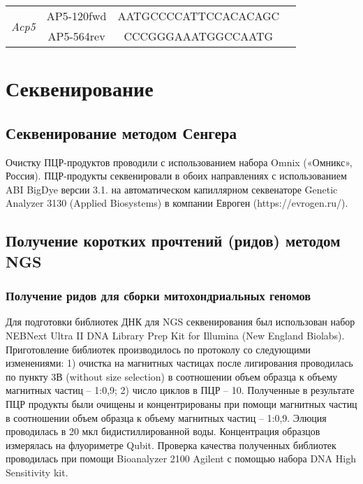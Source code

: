 \begin{table}[h!]
\begin{center}
\begin{tabular}{|c|c|c|c|}
\multirow{2}{*}{\textit{Acp5}}	& AP5-120fwd  & AATGCCCCATTCCACACAGC & \multirow{2}{*}{\cite{Steppan2017}}\\ 
\cline{2-3} 
& AP5-564rev & CCCGGGAAATGGCCAATG & \\ 
\hline

\end{tabular} 

\end{center}

\end{table}

\section{Секвенирование}

\subsection{Секвенирование методом Сенгера}

Очистку ПЦР-продуктов проводили с использованием набора Omnix («Омникс», Россия). ПЦР-продукты секвенировали в обоих направлениях с использованием ABI BigDye версии 3.1. на автоматическом капиллярном секвенаторе Genetic Analyzer 3130 (Applied Biosystems) в компании Евроген (https://evrogen.ru/).  

\subsection{Получение коротких прочтений (ридов) методом NGS}

\subsubsection{Получение ридов для сборки митохондриальных геномов}

Для подготовки библиотек ДНК для NGS секвенирования был использован набор NEBNext Ultra II DNA Library Prep Kit for Illumina (New England Biolabs). Приготовление библиотек производилось по протоколу со следующими изменениями: 1)  очистка на магнитных частицах после лигирования проводилась по пункту 3В (without size selection) в соотношении объем образца к объему магнитных частиц -- 1:0,9; 2) число циклов в ПЦР -- 10.
Полученные в результате ПЦР продукты были очищены и концентрированы при помощи магнитных частиц в соотношении объем образца к объему магнитных частиц -- 1:0,9. Элюция проводилась в 20 мкл бидистиллированной воды. Концентрация образцов измерялась на флуориметре Qubit.
Проверка качества полученных библиотек проводилась при помощи Bioanalyzer 2100 Agilent с помощью набора DNA High Sensitivity kit.

